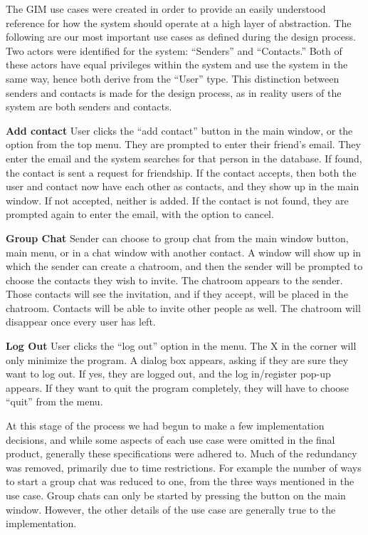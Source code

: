 The GIM use cases were created in order to provide an easily understood reference for how the system should operate at a high layer of abstraction. The following are our most important use cases as defined during the design process. Two actors were identified for the system: ``Senders'' and ``Contacts.'' Both of these actors have equal privileges within the system and use the system in the same way, hence both derive from the ``User'' type. This distinction between senders and contacts is made for the design process, as in reality users of the system are both senders and contacts.

{\bf Add contact}
User clicks the ``add contact'' button in the main window, or the option from the top menu. They are prompted to enter their friend's email. They enter the email and the system searches for that person in the database. If found, the contact is sent a request for friendship. If the contact accepts, then both the user and contact now have each other as contacts, and they show up in the main window. If not accepted, neither is added. If the contact is not found, they are prompted again to enter the email, with the option to cancel.

{\bf Group Chat}
Sender can choose to group chat from the main window button, main menu, or in a chat window with another contact. A window will show up in which the sender can create a chatroom, and then the sender will be prompted to choose the contacts they wish to invite. The chatroom appears to the sender. Those contacts will see the invitation, and if they accept, will be placed in the chatroom. Contacts will be able to invite other people as well. The chatroom will disappear once every user has left.

{\bf Log Out}
User clicks the ``log out'' option in the menu. The X in the corner will only minimize the program. A dialog box appears, asking if they are sure they want to log out. If yes, they are logged out, and the log in/register pop-up appears. If they want to quit the program completely, they will have to choose ``quit'' from the menu.

At this stage of the process we had begun to make a few implementation decisions, and while some aspects of each use case were omitted in the final product, generally these specifications were adhered to. Much of the redundancy was removed, primarily due to time restrictions. For example the number of ways to start a group chat was reduced to one, from the three ways mentioned in the use case. Group chats can only be started by pressing the button on the main window. However, the other details of the use case are generally true to the implementation.

